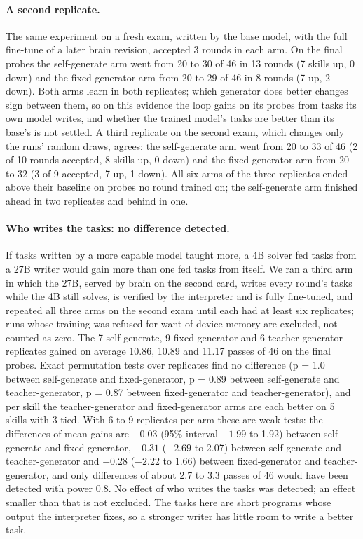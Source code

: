 \paragraph{A second replicate.} The same experiment on a fresh exam, written by the base model,
with the full fine-tune of a later brain revision, accepted 3 rounds in each arm. On the final probes the self-generate arm went
from 20 to 30 of 46 in 13 rounds (7 skills up, 0 down) and the fixed-generator arm from 20 to 29 of
46 in 8 rounds (7 up, 2 down). Both arms learn in both replicates; which generator does
better changes sign between them, so on this evidence the loop gains on its probes from tasks its own
model writes, and whether the trained model's tasks are better than its base's is not settled. A third
replicate on the second exam, which changes only the runs' random draws, agrees: the self-generate arm
went from 20 to 33 of 46 (2 of 10 rounds accepted, 8 skills up, 0 down) and the fixed-generator arm
from 20 to 32 (3 of 9 accepted, 7 up, 1 down). All six arms of the three replicates ended
above their baseline on probes no round trained on; the self-generate arm finished ahead in two
replicates and behind in one.

\paragraph{Who writes the tasks: no difference detected.} If tasks written by a more capable model
taught more, a 4B solver fed tasks from a 27B writer would gain more than one fed tasks from itself.
We ran a third arm in which the 27B, served by brain on the second card, writes every round's tasks
while the 4B still solves, is verified by the interpreter and is fully fine-tuned, and repeated all
three arms on the second exam until each had at least six replicates; runs whose training was refused
for want of device memory are excluded, not counted as zero. The 7 self-generate, 9 fixed-generator
and 6 teacher-generator replicates gained on average 10.86, 10.89 and 11.17 passes of 46 on the final
probes. Exact permutation tests over replicates find no difference (p = 1.0 between self-generate and
fixed-generator, p = 0.89 between self-generate and teacher-generator, p = 0.87 between
fixed-generator and teacher-generator), and per skill the teacher-generator and fixed-generator arms
are each better on 5 skills with 3 tied. With 6 to 9 replicates per arm these are weak
tests: the differences of mean gains are $-0.03$ (95\% interval $-1.99$ to 1.92) between self-generate
and fixed-generator, $-0.31$ ($-2.69$ to 2.07) between self-generate and teacher-generator and $-0.28$
($-2.22$ to 1.66) between fixed-generator and teacher-generator, and only differences of about 2.7 to
3.3 passes of 46 would have been detected with power 0.8. No effect of who writes the tasks was detected; an
effect smaller than that is not excluded. The tasks here are short programs whose output the
interpreter fixes, so a stronger writer has little room to write a better task.
